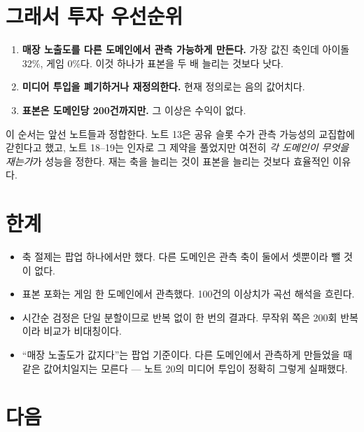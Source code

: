 \documentclass[10pt]{article}
\begin{document}

\section{그래서 투자 우선순위}

\begin{enumerate}[leftmargin=1.3em,itemsep=0.25em]
\item \textbf{매장 노출도를 다른 도메인에서 관측 가능하게 만든다.} 가장 값진 축인데
      아이돌 32\%, 게임 0\%다. 이것 하나가 표본을 두 배 늘리는 것보다 낫다.
\item \textbf{미디어 투입을 폐기하거나 재정의한다.} 현재 정의로는 음의 값어치다.
\item \textbf{표본은 도메인당 200건까지만.} 그 이상은 수익이 없다.
\end{enumerate}

이 순서는 앞선 노트들과 정합한다. 노트 13은 공유 슬롯 수가 관측 가능성의 교집합에
갇힌다고 했고, 노트 18--19는 인자로 그 제약을 풀었지만 여전히 \emph{각 도메인이
무엇을 재는가}가 성능을 정한다. 재는 축을 늘리는 것이 표본을 늘리는 것보다
효율적인 이유다.

\section{한계}

\begin{itemize}[leftmargin=1.1em,itemsep=0.15em]
\item 축 절제는 팝업 하나에서만 했다. 다른 도메인은 관측 축이 둘에서 셋뿐이라
      뺄 것이 없다.
\item 표본 포화는 게임 한 도메인에서 관측했다. 100건의 이상치가 곡선 해석을
      흐린다.
\item 시간순 검정은 단일 분할이므로 반복 없이 한 번의 결과다. 무작위 쪽은
      200회 반복이라 비교가 비대칭이다.
\item ``매장 노출도가 값지다''는 팝업 기준이다. 다른 도메인에서 관측하게 만들었을 때
      같은 값어치일지는 모른다 --- 노트 20의 미디어 투입이 정확히 그렇게 실패했다.
\end{itemize}

\section{다음}
\end{document}
